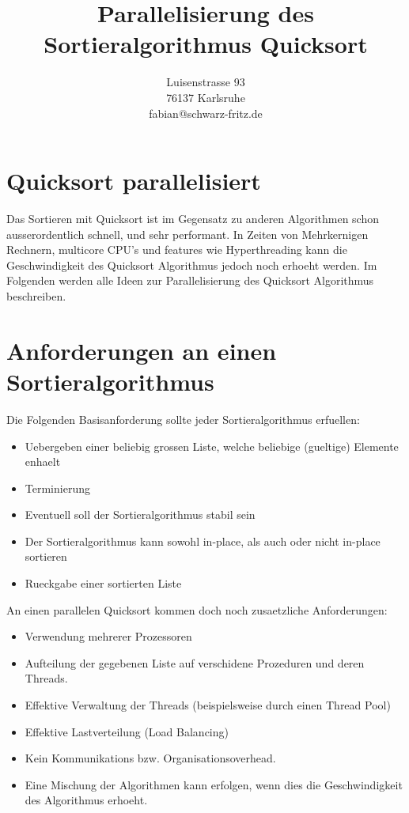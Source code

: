 \documentclass[12pt,twoside,a4paper]{article}
\title{Parallelisierung des Sortieralgorithmus Quicksort}
\author{
Luisenstrasse 93\\
76137 Karlsruhe\\
fabian@schwarz-fritz.de}
\begin{document}
\maketitle
\newpage
\section{Quicksort parallelisiert}
Das Sortieren mit Quicksort ist im Gegensatz zu anderen Algorithmen schon ausserordentlich schnell, und sehr performant. In Zeiten von Mehrkernigen Rechnern, multicore CPU's und features wie Hyperthreading kann die Geschwindigkeit des Quicksort Algorithmus jedoch noch erhoeht werden. Im Folgenden werden alle Ideen zur Parallelisierung des Quicksort Algorithmus beschreiben.

\section{Anforderungen an einen Sortieralgorithmus}
Die Folgenden Basisanforderung sollte jeder Sortieralgorithmus erfuellen:
\begin{itemize}
  \item Uebergeben einer beliebig grossen Liste, welche beliebige (gueltige) Elemente enhaelt
  \item Terminierung
  \item Eventuell soll der Sortieralgorithmus stabil sein
  \item Der Sortieralgorithmus kann sowohl in-place, als auch oder nicht in-place sortieren
  \item Rueckgabe einer sortierten Liste
\end{itemize}
An einen parallelen Quicksort kommen doch noch zusaetzliche Anforderungen:
\begin{itemize}
	\item Verwendung mehrerer Prozessoren
	\item Aufteilung der gegebenen Liste auf verschidene Prozeduren und deren Threads.
	\item Effektive Verwaltung der Threads (beispielsweise durch einen Thread Pool)
	\item Effektive Lastverteilung (Load Balancing)
	\item Kein Kommunikations bzw. Organisationsoverhead.
	\item Eine Mischung der Algorithmen kann erfolgen, wenn dies die Geschwindigkeit des Algorithmus erhoeht.
\end{itemize}
\end{document}
